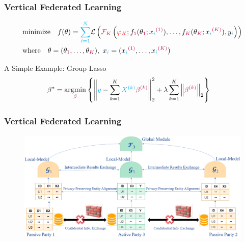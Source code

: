 
\begin{frame}
\frametitle{Vertical Federated Learning}

{\smaller
\begin{align*}
    & \text{minimize} \quad f(\theta) = {\color{cyan} \sum_{i=1}^N} \mathcal{L} \left( {\color{red} \mathcal{F}_K}\left( {\color{red} \varphi_K}; f_{\color{purple} 1}(\theta_{\color{purple} 1}; x_{\color{cyan} i}^{\color{purple} (1)}), \ldots, f_{\color{purple} K}(\theta_{\color{purple} K}; x_{\color{cyan} i}^{\color{purple} (K)}), y_{\color{cyan} i} \right) \right) \\
    & \text{where} \quad \theta = (\theta_{\color{purple} 1}, \ldots, \theta_{\color{purple} K}), ~ x_{\color{cyan} i} = (x_{\color{cyan} i}^{\color{purple} (1)}, \ldots, x_{\color{cyan} i}^{\color{purple}(K)})
\end{align*}
}

\begin{block}{A Simple Example: Group Lasso}
\begin{align*}
\beta^{\ast} & = \operatorname*{argmin}_{{\color{purple} \beta}} \left\{ \left\lVert {\color{cyan} y} - \sum_{k=1}^{K} {\color{cyan} X^{(k)}} {\color{purple} \beta^{(k)}} \right\rVert_2^{2} + \lambda \sum_{k=1}^{K} \left\lVert {\color{purple} \beta^{(k)}} \right\rVert_2 \right\}
\end{align*}
\end{block}


\end{frame}


\begin{frame}
\frametitle{Vertical Federated Learning}

\begin{figure}
\centering
\includegraphics[width=\textwidth,keepaspectratio]{images/vfl.png}
\end{figure}


\end{frame}

